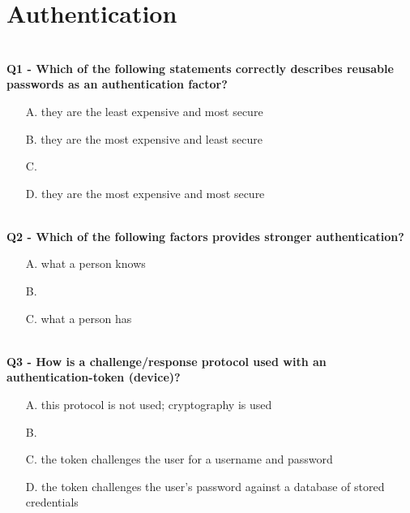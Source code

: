 \section{Authentication}
\textbf{\\Q1 - Which of the following statements correctly describes reusable passwords as an authentication factor?}
\begin{enumerate}
    \item[A.] they are the least expensive and most secure
    \item[B.] they are the most expensive and least secure
    \item[C.] 
    \item[D.] they are the most expensive and most secure
\end{enumerate}

\textbf{\\Q2 - Which of the following factors provides stronger authentication?}
\begin{enumerate}
    \item[A.] what a person knows
    \item[B.] 
    \item[C.] what a person has
\end{enumerate}

\textbf{\\Q3 - How is a challenge/response protocol used with an authentication-token (device)?}
\begin{enumerate}
    \item[A.] this protocol is not used; cryptography is used
    \item[B.] 
    \item[C.] the token challenges the user for a username and password
    \item[D.] the token challenges the user’s password against a database of stored credentials
\end{enumerate}

